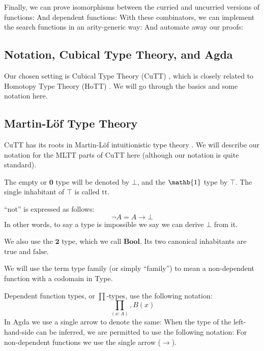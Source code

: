 Finally, we can prove isomorphisms between the curried and uncurried versions of
functions:
And dependent functions:
With these combinators, we can implement the search functions in an
arity-generic way:
And automate away our proofs:

\begin{subappendices}

\section{Notation, Cubical Type Theory, and Agda}
Our chosen setting is Cubical Type Theory (CuTT)
\cite{cohenCubicalTypeTheory2016}, which is closely related to Homotopy Type
Theory (HoTT) \cite{hottbook}.
We will go through the basics and some notation here.
\subsection{Martin-Löf Type Theory}
CuTT has its roots in Martin-Löf intuitionistic type theory
\cite{martin-lofIntuitionisticTypeTheory1980}.
We will describe our notation for the MLTT parts of CuTT here (although our
notation is quite standard).

The empty or \(\mathbf{0}\) type will be denoted by \(\bot\), and the
\(\mathb{1}\) type by \(\top\).
The single inhabitant of \(\top\) is called \(\text{tt}\).

``not'' is expressed as follows:
\begin{equation}
  \neg A = A \rightarrow \bot
\end{equation}
In other words, to say a type is impossible we say we can derive \(\bot\) from
it.

We also use the \(\mathbf{2}\) type, which we call \(\textbf{Bool}\).
Its two canonical inhabitants are \(\text{true}\) and \(\text{false}\).

We will use the term type family (or simply ``family'') to mean a non-dependent
function with a codomain in Type.





Dependent function types, or \(\prod\)-types, use the following notation:
\begin{equation}
  \prod_{(x : A)} , B (x)
\end{equation}
In Agda we use a single arrow to denote the same:
When the type of the left-hand-side can be inferred, we are permitted to use the
following notation:
For non-dependent functions we use the single arrow (\(\rightarrow\)).


\end{subappendices}
